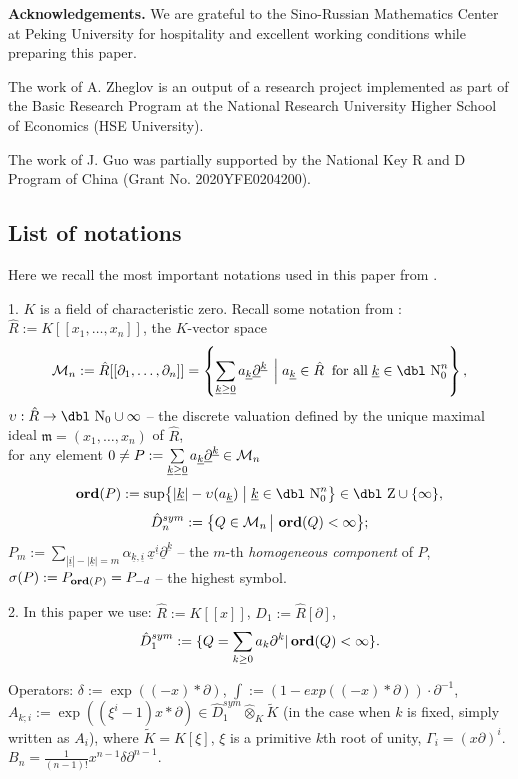\documentclass[11pt]{article}
\theoremstyle{definition}
\newcommand{\dz}{{\mbox{\dbl Z}}}
\newcommand{\dn}{{\mbox{\dbl N}}}
\newcommand{\idm}{\mathfrak{m}}
\theoremstyle{plain}
\numberwithin{equation}{section}
\newcommand{\cm}{{{\cal M}}}
\newcommand{\Ord}{\mathop {\rm \bf ord}}
\begin{document}
{\bf Acknowledgements.}  We are grateful to the Sino-Russian Mathematics Center at Peking University for hospitality and excellent working conditions while preparing this paper.

The work of A. Zheglov is an output of a research project implemented as part of the Basic Research Program at the National Research University Higher School of Economics (HSE University).

The work of J. Guo was partially supported by the National Key R and D Program of China (Grant No. 2020YFE0204200).



\subsection{List of notations}
\label{S:list}

 Here we recall  the most important notations used in this paper from \cite{GZ24}.
 
1. $K$ is a field of characteristic zero. Recall some notation from \cite{A.Z}:
	$\hat{R}:=K [[x_1,\ldots ,x_n]]$, the $K$-vector space 
$$
\cm_n := \hat{R} [[\partial_1, \dots, \partial_n]] = \left\{
\sum\limits_{\underline{k} \ge \underline{0}} a_{\underline{k}} \underline{\partial}^{\underline{k}} \; \left|\;  a_{\underline{k}} \in \hat{R} \right. \;\mbox{for all}\;  \underline{k} \in \dn_0^n
\right\},
$$
$\upsilon:\hat{R}\rightarrow \dn_0\cup \infty$ --  the discrete valuation defined by the unique maximal ideal $\idm = (x_1, \dots, x_n)$ of $\hat{R}$,  \\
for any element
$
0\neq P := \sum\limits_{\underline{k} \ge \underline{0}} a_{\underline{k}} \underline{\partial}^{\underline{k}} \in \cm_n
$
$$
\Ord (P) := \sup\bigl\{|\underline{k}| - \upsilon(a_{\underline{k}}) \; \big|\; \underline{k} \in \dn_0^n \bigr\} \in \dz \cup \{\infty \},
$$
$$
\hat{D}_n^{sym}:=\bigl\{Q \in \cm_n \,\big|\, \Ord (Q) < \infty \bigr\};
$$
$
P_m:= \sum\limits_{ |\underline{i}| - |\underline{k}| = m} \alpha_{\underline{k}, \underline{i}} \,  \underline{x}^{\underline{i}} \underline{\partial}^{\underline{k}}
$ -- the $m$-th \emph{homogeneous component} of $P$,\\
$\sigma (P):=P_{\Ord (P)}=P_{-d}$ -- the highest symbol.
	
2. In this paper we use: 	
	$\hat{R}:=K[[x]]$, $D_1:=\hat{R}[\partial]$, 
$$\hat{D}_1^{sym}:=\{Q=\sum_{k\ge 0}a_k\partial^k|\Ord(Q)<\infty\}.$$ 

Operators:  $\delta:=\exp((-x)\ast \partial)$,   $\int:=(1-exp((-x)\ast \partial))\cdot \partial^{-1} $,  	$A_{k;i}:=\exp((\xi^{i}-1)x\ast \partial)\in \hat{D}^{sym}_{1}\hat{\otimes}_{K}\tilde{K}$ (in the case when $k$ is fixed, simply written as $A_i$), where $\tilde{K}=K[\xi]$, $\xi$ is a primitive $k$th root of unity, 
$\Gamma_i=(x\partial)^i$. $B_n=\frac{1}{(n-1)!}x^{n-1}\delta\partial^{n-1}$. 
\end{document}
